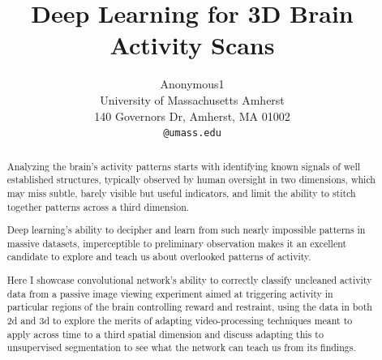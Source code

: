 \documentclass[10pt,twocolumn,letterpaper]{article}
\begin{document}
\title{Deep Learning for 3D Brain Activity Scans}

\author{Anonymous1\\
University of Massachusetts Amherst\\
140 Governors Dr, Amherst, MA 01002\\
{\tt\small @umass.edu}
}

\maketitle

\begin{abstract}
 Analyzing the brain's activity patterns starts with identifying known signals of well established structures,
 typically observed by human oversight in two dimensions, which may miss subtle, barely visible but useful indicators,
 and limit the ability to stitch together patterns across a third dimension.

 Deep learning's ability to decipher and learn from such nearly impossible patterns in massive datasets,
 imperceptible to preliminary observation makes it an excellent candidate to explore and teach us about
 overlooked patterns of activity.

 Here I showcase convolutional network's ability to correctly classify uncleaned activity data from a passive
 image viewing experiment aimed at triggering activity in particular regions of the brain controlling reward and
 restraint, using the data in both 2d and 3d to explore the merits of adapting video-processing techniques meant
 to apply across time to a third spatial dimension and discuss adapting this to unsupervised segmentation to see
 what the network can teach us from its findings.

\end{abstract}







{\small


}
\end{document}
